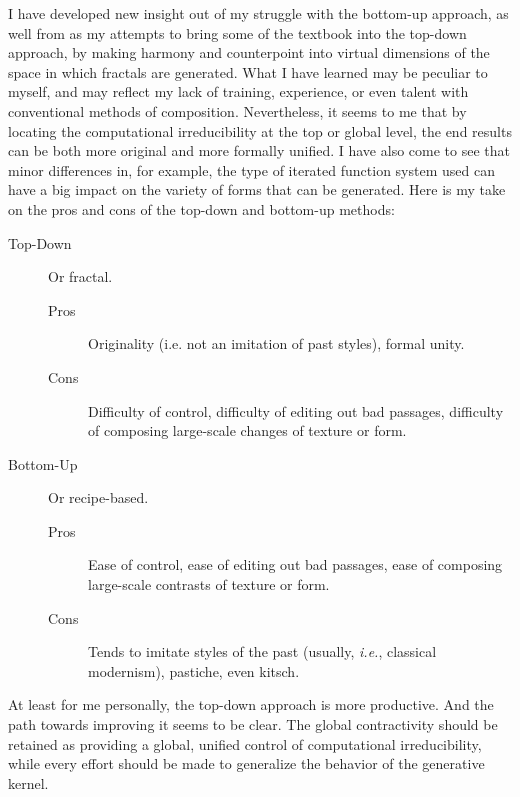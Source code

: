\documentclass[english,11pt,letterpaper,onecolumn]{scrartcl}
\numberwithin{equation}{section}
\begin{document}
I have developed new insight out of my struggle with the bottom-up approach, as well from as my attempts to bring some of the textbook into the top-down approach, by making harmony and counterpoint into virtual dimensions of the space in which fractals are generated. What I have learned may be peculiar to myself, and may reflect my lack of training, experience, or even talent with conventional methods of composition. Nevertheless, it seems to me that by locating the computational irreducibility at the top or global level, the end results can be both more original and more formally unified. I have also come to see that minor differences in, for example, the type of iterated function system used can have a big impact on the variety of forms that can be generated. Here is my take on the pros and cons of the top-down and bottom-up methods:

\begin{description}
	\item[Top-Down] Or fractal.
	\begin{description}
		\item[Pros] Originality (i.e. not an imitation of past styles), formal unity.
		\item[Cons] Difficulty of control, difficulty of editing out bad passages, difficulty of composing large-scale changes of texture or form.
	\end{description}
	\item[Bottom-Up] Or recipe-based.
	\begin{description}
		\item[Pros] Ease of control, ease of editing out bad passages, ease of composing large-scale contrasts of texture or form.
		\item[Cons] Tends to imitate styles of the past (usually, \textit{i.e.}, classical modernism), pastiche, even kitsch.
	\end{description}
\end{description}

At least for me personally, the top-down approach is more productive. And the path towards improving it seems to be clear. The global contractivity should be retained as providing a global, unified control of computational irreducibility, while every effort should be made to generalize the behavior of the generative kernel. 
\end{document}
